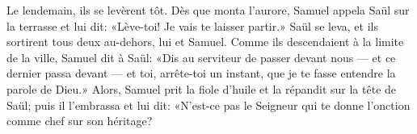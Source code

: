 Le lendemain, ils se levèrent tôt.
Dès que monta l’aurore, Samuel appela Saül sur la terrasse et lui dit:
	«Lève-toi! Je vais te laisser partir.»
Saül se leva, et ils sortirent tous deux au-dehors, lui et Samuel.
Comme ils descendaient à la limite de la ville, Samuel dit à Saül:
	«Dis au serviteur de passer devant nous
	--- et ce dernier passa devant ---
	et toi, arrête-toi un instant, que je te fasse entendre la parole de Dieu.»
Alors, Samuel prit la fiole d’huile et la répandit sur la tête de Saül;
	puis il l’embrassa et lui dit:
	«N’est-ce pas le Seigneur qui te donne l’onction
		comme chef sur son héritage?

